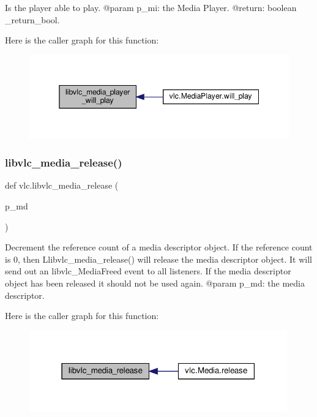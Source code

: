\begin{DoxyVerb}Is the player able to play.
@param p_mi: the Media Player.
@return: boolean \libvlc_return_bool.
\end{DoxyVerb}
 Here is the caller graph for this function\+:
\nopagebreak
\begin{figure}[H]
\begin{center}
\leavevmode
\includegraphics[width=345pt]{namespacevlc_af96b4d82a14cecf87ad162cd688dd86e_icgraph}
\end{center}
\end{figure}
\mbox{\label{namespacevlc_ae668655a5e78df06ce22579586bb62bc}} 
\subsubsection{\texorpdfstring{libvlc\+\_\+media\+\_\+release()}{libvlc\_media\_release()}}
{\footnotesize\ttfamily def vlc.\+libvlc\+\_\+media\+\_\+release (\begin{DoxyParamCaption}\item[{}]{p\+\_\+md }\end{DoxyParamCaption})}

\begin{DoxyVerb}Decrement the reference count of a media descriptor object. If the
reference count is 0, then L{libvlc_media_release}() will release the
media descriptor object. It will send out an libvlc_MediaFreed event
to all listeners. If the media descriptor object has been released it
should not be used again.
@param p_md: the media descriptor.
\end{DoxyVerb}
 Here is the caller graph for this function\+:
\nopagebreak
\begin{figure}[H]
\begin{center}
\leavevmode
\includegraphics[width=316pt]{namespacevlc_ae668655a5e78df06ce22579586bb62bc_icgraph}
\end{center}
\end{figure}
\mbox{\label{namespacevlc_a2b167bfab4fb7404a19959b120c74587}} 
